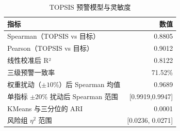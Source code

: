 \begin{table}[htbp]
\centering
\caption{TOPSIS 预警模型与灵敏度}
\label{tab:topsis}
\small
\begin{tabular}{lr}
\toprule
指标 & 数值 \\
\midrule
Spearman（TOPSIS vs 目标） & 0.8805 \\
Pearson（TOPSIS vs 目标） & 0.9012 \\
线性校准后 R² & 0.8122 \\
三级预警一致率 & 71.52\% \\
权重扰动（$\pm10$\%）后 Spearman 均值 & 0.9689 \\
单指标 $\pm20$\% 扰动后 Spearman 范围 & [0.9919,0.9947] \\
KMeans 与三分位的 ARI & 0.0001 \\
风险组 $\eta^2$ 范围 & [0.0236, 0.0271] \\
\bottomrule
\end{tabular}
\end{table}
